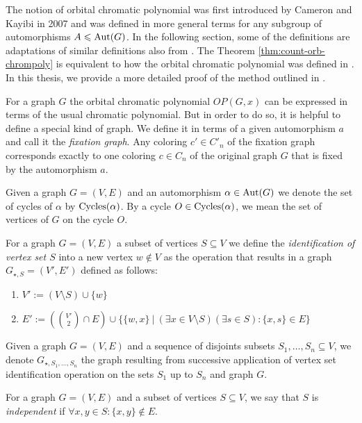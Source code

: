 The notion of orbital chromatic polynomial was first introduced by Cameron and Kayibi \cite{caka2007} in 2007 and was defined in more general terms for any subgroup of automorphisms $A \leqslant  \operatorname{Aut}(G)$. In the following section, some of the definitions are adaptations of similar definitions also from \cite{caka2007}. The Theorem \ref{thm:count-orb-chrompoly} is equivalent to how the orbital chromatic polynomial was defined in \cite{caka2007}. In this thesis, we provide a more detailed proof of the method outlined in \cite{caka2007}. 

For a graph $G$ the orbital chromatic polynomial $OP(G,x)$ can be expressed in terms of the usual chromatic polynomial. But in order to do so, it is helpful to define a special kind of graph. We define it in terms of a given automorphism $a$ and call it the \textit{fixation graph}. Any coloring $c' \in C'_n$ of the fixation graph corresponds exactly to one coloring $c \in C_n$ of the original graph $G$ that is fixed by the automorphism $a$.

\begin{defn}
    Given a graph $G=(V,E)$ and an automorphism $\alpha \in \operatorname{Aut}(G)$ we denote the set of cycles of $\alpha$ by $\operatorname{Cycles}(\alpha)$. By a cycle $O \in \operatorname{Cycles}(\alpha)$, we mean the set of vertices of $G$ on the cycle $O$.
\end{defn}

\begin{defn}
    For a graph $G=(V,E)$ a subset of vertices $S \subseteq V$ we define the \emph{identification of vertex set $S$} into a new vertex $w \notin V$ as the operation that results in a graph $G_{\star,S}=(V',E')$ defined as follows:
    \begin{enumerate}
        \item $V' := (V \setminus S) \cup \{w\}$
        \item $E' := \left( \binom{V'}{2} \cap E\right) \cup \{ \{w,x\} \ | \ (\exists x \in V \setminus S)(\exists s \in S): \{x,s\} \in E\}$
    \end{enumerate}
\end{defn}

Given a graph $G=(V,E)$ and a sequence of disjoints subsets $S_1, \ldots , S_n \subseteq V$, we denote $G_{\star,S_1,\ldots,S_n}$ the graph resulting from successive application of vertex set identification operation on the sets $S_1$ up to $S_n$ and graph $G$.

\begin{defn}
    For a graph $G=(V,E)$ and a subset of vertices $S \subseteq V$, we say that $S$ is \emph{independent} if $\forall x,y \in S : \{x,y\} \notin E$.
\end{defn}

